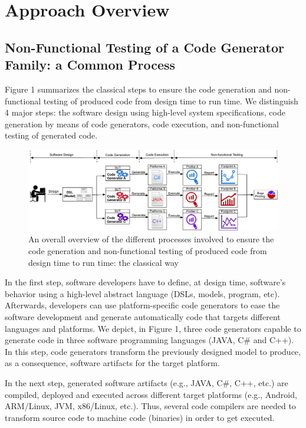 \section{Approach Overview}


\subsection{Non-Functional Testing of a Code Generator Family: a Common Process}

Figure 1 summarizes the classical steps to ensure the code generation and non-functional testing of produced code from design time to run time. 
We distinguish 4 major steps: the software design using high-level system specifications, code generation by means of code generators, code execution, and non-functional testing of generated code. 


\begin{figure}[t]
	\includegraphics[width=1\linewidth]{Ressources/background.pdf}
	\caption{An overall overview of the different processes involved to ensure the code generation and non-functional testing of produced code from design time to run time: the classical way}
\end{figure}


In the first step, software developers have to define, at design time, software's behavior using a high-level abstract language (DSLs, models, program, etc). Afterwards, developers can use platform-specific code generators to ease the software development and generate automatically code that targets different languages and platforms. We depict, in Figure 1, three code generators capable to generate code in three software programming languages (JAVA, C\# and C++). In this step, code generators transform the previously designed model to produce, as a consequence, software artifacts for the target platform.

In the next step, generated software artifacts (e.g., JAVA, C\#, C++, etc.) are compiled, deployed and executed across different target platforms (e.g., Android, ARM/Linux, JVM, x86/Linux, etc.). Thus, several code compilers are needed to transform source code to machine code (binaries) in order to get executed. 

